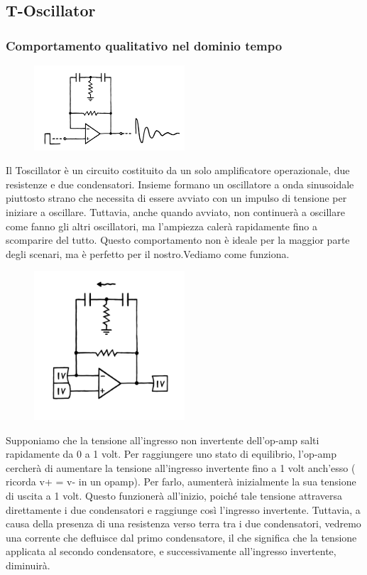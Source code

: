 \documentclass{article}
\begin{document}
\subsection{T-Oscillator}
\subsubsection{Comportamento qualitativo nel dominio tempo}
\begin{figure}[ht]
    \centering
    \includegraphics[width=0.5\textwidth]{Toscillator.png} 
    \label{fig:Toscillator}
\end{figure}

Il Toscillator è un circuito costituito da un solo amplificatore operazionale, due resistenze e due condensatori. Insieme formano un oscillatore a onda sinusoidale piuttosto strano che necessita di essere avviato con un impulso di tensione per iniziare a oscillare.
Tuttavia, anche quando avviato, non continuerà a oscillare come fanno gli altri oscillatori, ma l'ampiezza calerà rapidamente fino a scomparire del tutto. Questo comportamento non è ideale per la maggior parte degli scenari, ma è perfetto per il nostro.Vediamo come funziona.

\begin{figure}[ht]
    \centering
    \includegraphics[width=0.5\textwidth]{Toscillator1.png} 
    \label{fig:Toscillator1}
\end{figure}

 Supponiamo che la tensione all'ingresso non invertente dell'op-amp salti rapidamente da 0 a 1 volt. Per raggiungere uno stato di equilibrio, l'op-amp cercherà di aumentare la tensione all'ingresso invertente fino a 1 volt anch'esso ( ricorda v+ = v- in un opamp).
 Per farlo, aumenterà inizialmente la sua tensione di uscita a 1 volt. Questo funzionerà all'inizio, poiché tale tensione attraversa direttamente i due condensatori e raggiunge così l'ingresso invertente.
 Tuttavia, a causa della presenza di una resistenza verso terra tra i due condensatori, vedremo una corrente che defluisce dal primo condensatore, il che significa che la tensione applicata al secondo condensatore, e successivamente all'ingresso invertente, diminuirà.
\end{document}
